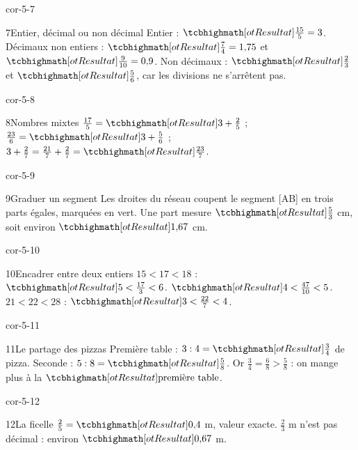 \begin{blocLivre}{cor-5-7}\begin{corrige}{7}{Entier, décimal ou non décimal}
Entier : $\res{\frac{15}5=3}$. Décimaux non entiers : $\res{\frac74=1{,}75}$ et $\res{\frac9{10}=0{,}9}$. Non décimaux : $\res{\frac23}$ et $\res{\frac56}$, car les divisions ne s’arrêtent pas.
\end{corrige}\end{blocLivre}
\begin{blocLivre}{cor-5-8}\begin{corrige}{8}{Nombres mixtes}
$\frac{17}5=\res{3+\frac25}$ ; $\frac{23}6=\res{3+\frac56}$ ; $3+\frac27=\frac{21}7+\frac27=\res{\frac{23}7}$.
\end{corrige}\end{blocLivre}
\begin{blocLivre}{cor-5-9}\begin{corrige}{9}{Graduer un segment}
Les droites du réseau coupent le segment [AB] en trois parts égales, marquées en vert. Une part mesure $\res{\frac53}$ cm, soit environ $\res{1{,}67}$ cm.
\label{fig-cor-5-9}
\end{corrige}\end{blocLivre}
\begin{blocLivre}{cor-5-10}\begin{corrige}{10}{Encadrer entre deux entiers}
$15<17<18$ : $\res{5<\frac{17}3<6}$. $\res{4<\frac{47}{10}<5}$. $21<22<28$ : $\res{3<\frac{22}7<4}$.
\end{corrige}\end{blocLivre}
\begin{blocLivre}{cor-5-11}\begin{corrige}{11}{Le partage des pizzas}
Première table : $3:4=\res{\frac34}$ de pizza. Seconde : $5:8=\res{\frac58}$. Or $\frac34=\frac68>\frac58$ : on mange plus à la $\res{\text{première table}}$.
\end{corrige}\end{blocLivre}
\begin{blocLivre}{cor-5-12}\begin{corrige}{12}{La ficelle}
$\frac25=\res{0{,}4}$ m, valeur exacte. $\frac23$ m n’est pas décimal : environ $\res{0{,}67}$ m.
\end{corrige}\end{blocLivre}
